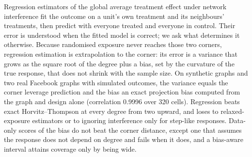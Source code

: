 Regression estimators of the global average treatment effect under network interference fit the outcome on a unit's own treatment and its neighbours' treatments, then predict with everyone treated and everyone in control. Their error is understood when the fitted model is correct; we ask what determines it otherwise. Because randomised exposure never reaches those two corners, regression estimation is extrapolation to the corner: its error is a variance that grows as the square root of the degree plus a bias, set by the curvature of the true response, that does not shrink with the sample size. On synthetic graphs and two real Facebook graphs with simulated outcomes, the variance equals the corner leverage prediction and the bias an exact projection bias computed from the graph and design alone (correlation 0.9996 over 320 cells). Regression beats exact Horvitz--Thompson at every degree from two upward, and loses to relaxed-exposure estimators or to ignoring interference only for step-like responses. Data-only scores of the bias do not beat the corner distance, except one that assumes the response does not depend on degree and fails when it does, and a bias-aware interval attains coverage only by being wide.
